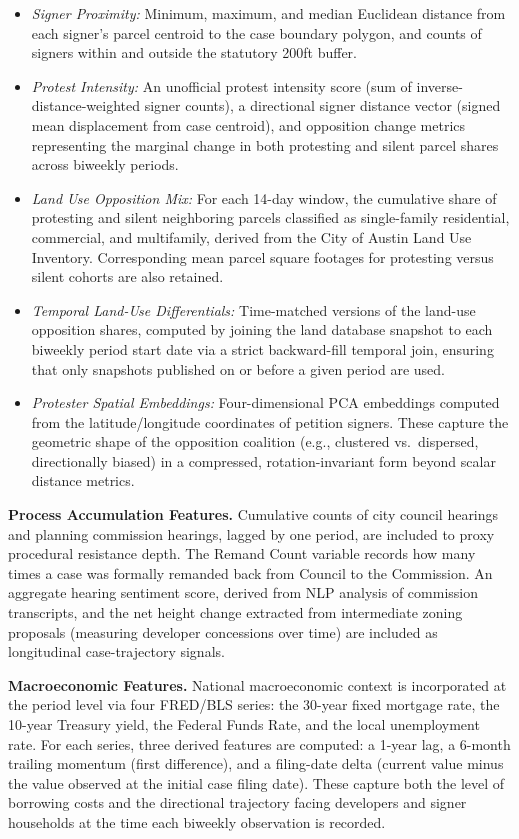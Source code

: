 \documentclass[11pt, letterpaper, oneside]{article}
\begin{document}
\begin{itemize}
    \item \textit{Signer Proximity:} Minimum, maximum, and median Euclidean distance from each signer's parcel centroid to the case boundary polygon, and counts of signers within and outside the statutory 200ft buffer.
    \item \textit{Protest Intensity:} An unofficial protest intensity score (sum of inverse-distance-weighted signer counts), a directional signer distance vector (signed mean displacement from case centroid), and opposition change metrics representing the marginal change in both protesting and silent parcel shares across biweekly periods.
    \item \textit{Land Use Opposition Mix:} For each 14-day window, the cumulative share of protesting and silent neighboring parcels classified as single-family residential, commercial, and multifamily, derived from the City of Austin Land Use Inventory. Corresponding mean parcel square footages for protesting versus silent cohorts are also retained.
    \item \textit{Temporal Land-Use Differentials:} Time-matched versions of the land-use opposition shares, computed by joining the land database snapshot to each biweekly period start date via a strict backward-fill temporal join, ensuring that only snapshots published on or before a given period are used.
    \item \textit{Protester Spatial Embeddings:} Four-dimensional PCA embeddings computed from the latitude/longitude coordinates of petition signers. These capture the geometric shape of the opposition coalition (e.g., clustered vs.\ dispersed, directionally biased) in a compressed, rotation-invariant form beyond scalar distance metrics.
\end{itemize}

\textbf{Process Accumulation Features.} Cumulative counts of city council hearings and planning commission hearings, lagged by one period, are included to proxy procedural resistance depth. The Remand Count variable records how many times a case was formally remanded back from Council to the Commission. An aggregate hearing sentiment score, derived from NLP analysis of commission transcripts, and the net height change extracted from intermediate zoning proposals (measuring developer concessions over time) are included as longitudinal case-trajectory signals.

\textbf{Macroeconomic Features.} National macroeconomic context is incorporated at the period level via four FRED/BLS series: the 30-year fixed mortgage rate, the 10-year Treasury yield, the Federal Funds Rate, and the local unemployment rate. For each series, three derived features are computed: a 1-year lag, a 6-month trailing momentum (first difference), and a filing-date delta (current value minus the value observed at the initial case filing date). These capture both the level of borrowing costs and the directional trajectory facing developers and signer households at the time each biweekly observation is recorded.
\end{document}
